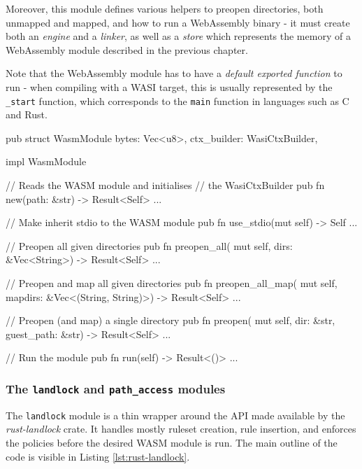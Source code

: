 Moreover, this module defines various helpers to preopen directories, both unmapped and mapped, and
how to run a WebAssembly binary - it must create both an \textit{engine} and a \textit{linker},
as well as a \textit{store} which represents the memory of a WebAssembly module described in the previous chapter.

Note that the WebAssembly module has to have a \textit{default exported function} to run - when compiling with a WASI target,
this is usually represented by the \texttt{\_start} function, which corresponds to the \texttt{main} function in languages
such as C and Rust.

\begin{code}[language=Rust, caption=The outline of the \texttt{wasm} module]
  pub struct WasmModule {
    bytes: Vec<u8>, ctx_builder: WasiCtxBuilder,
  }
  
  impl WasmModule {
    // Reads the WASM module and initialises
    // the WasiCtxBuilder
    pub fn new(path: &str) -> Result<Self> {...}
  
    // Make inherit stdio to the WASM module
    pub fn use_stdio(mut self) -> Self {...}
  
    // Preopen all given directories
    pub fn preopen_all(
      mut self,
      dirs: &Vec<String>) -> Result<Self> {...}
  
    // Preopen and map all given directories
    pub fn preopen_all_map(
      mut self,
      mapdirs: &Vec<(String, String)>)
      -> Result<Self> {...}
  
    // Preopen (and map) a single directory
    pub fn preopen(
      mut self,
      dir: &str, guest_path: &str) -> Result<Self> {...}
  
    // Run the module
    pub fn run(self) -> Result<()> {...}
  }  
  \end{code}

\subsubsection{The \texttt{landlock} and \texttt{path\_access} modules}

The \texttt{landlock} module is a thin wrapper around the API made available by the \textit{rust-landlock} crate.
It handles mostly ruleset creation, rule insertion, and enforces the policies before the desired WASM module is run.
The main outline of the code is visible in Listing \ref{lst:rust-landlock}.

